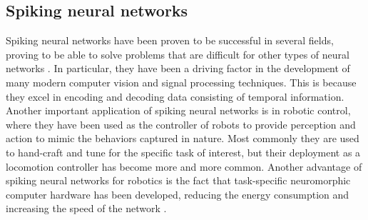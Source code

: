   \subsection{Spiking neural networks}
  Spiking neural networks have been proven to be successful in several fields, proving to be able to solve problems that are difficult for other types of neural networks \cite{application-snns}.
  In particular, they have been a driving factor in the development of many modern computer vision and signal processing techniques.
  This is because they excel in encoding and decoding data consisting of temporal information.
  Another important application of spiking neural networks is in robotic control, where they have been used as the controller of robots to provide perception and action to mimic the behaviors captured in nature.
  Most commonly they are used to hand-craft and tune for the specific task of interest, but their deployment as a locomotion controller has become more and more common.
  Another advantage of spiking neural networks for robotics is the fact that task-specific neuromorphic computer hardware has been developed, reducing the energy consumption and increasing the speed of the network \cite{neuromorphic-robotic}.

